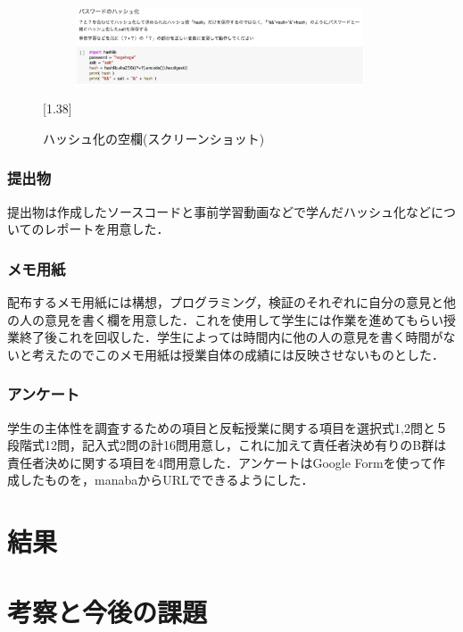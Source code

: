 \documentclass[a4j,11pt]{jsarticle}
\begin{document}
\begin{figure}[h]
\begin{center}
\scalebox{1.5}[1.38]{
 \includegraphics[clip,width=85mm,height=40mm]{kadai3.pdf}
 }
\end{center}
 \caption{ハッシュ化の空欄(スクリーンショット)}
 \label{kadai3}
\end{figure}


\subsubsection{提出物}
提出物は作成したソースコードと事前学習動画などで学んだハッシュ化などについてのレポートを用意した．

\subsubsection{メモ用紙}
配布するメモ用紙には構想，プログラミング，検証のそれぞれに自分の意見と他の人の意見を書く欄を用意した．これを使用して学生には作業を進めてもらい授業終了後これを回収した．学生によっては時間内に他の人の意見を書く時間がないと考えたのでこのメモ用紙は授業自体の成績には反映させないものとした．

\subsubsection{アンケート}
学生の主体性を調査するための項目と反転授業に関する項目を選択式1,2問と５段階式12問，記入式2問の計16問用意し，これに加えて責任者決め有りのB群は責任者決めに関する項目を4問用意した．アンケートはGoogle Formを使って作成したものを，manabaからURLでできるようにした．

\newpage

\section{結果}


\newpage

\section{考察と今後の課題}
\end{document}
